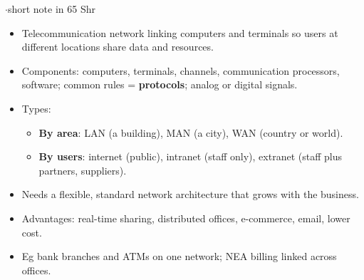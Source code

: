 {\color{sub}\footnotesize {}  \gap$\cdot$\gap short note in 65 Shr}
\begin{itemize}
  \item Telecommunication network linking computers and terminals so users at different
    locations share data and resources.
  \item Components: computers, terminals, channels, communication processors, software;
    common rules = \textbf{protocols}; analog or digital signals.
  \item Types:
  \begin{itemize}
    \item \textbf{By area}: LAN (a building), MAN (a city), WAN (country or world).
    \item \textbf{By users}: internet (public), intranet (staff only), extranet (staff plus
      partners, suppliers).
  \end{itemize}
  \item Needs a flexible, standard network architecture that grows with the business.
  \item Advantages: real-time sharing, distributed offices, e-commerce, email, lower cost.
  \item Eg bank branches and ATMs on one network; NEA billing linked across offices.
\end{itemize}

